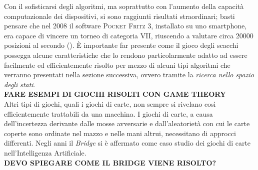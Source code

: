 Con il sofisticarsi degli algoritmi, ma soprattutto con l'aumento della capacità computazionale dei dispositivi, si sono raggiunti risultati straordinari; basti pensare che nel 2008 il software \textsc{Pocket Fritz 3}, installato su uno smartphone, era capace di vincere un torneo di categoria VII, riuscendo a valutare circa 20000 posizioni al secondo (\cite{pocketfritz}).
È importante far presente come il gioco degli scacchi possegga alcune caratteristiche che lo rendono particolarmente adatto ad essere facilmente ed efficientemente risolto per mezzo di alcuni tipi algoritmi che verranno presentati nella sezione successiva, ovvero tramite la \emph{ricerca nello spazio degli stati}.\\




\textbf{FARE ESEMPI DI GIOCHI RISOLTI CON GAME THEORY}\\



Altri tipi di giochi, quali i giochi di carte, non sempre si rivelano così efficientemente trattabili da una macchina.
I giochi di carte, a causa dell'incertezza derivante dalle mosse avversarie e dall'aleatorietà con cui le carte coperte sono ordinate nel mazzo e nelle mani altrui, necessitano di approcci differenti.
Negli anni il \emph{Bridge} si è affermato come caso studio dei giochi di carte nell'Intelligenza Artificiale.\\




\textbf{DEVO SPIEGARE COME IL BRIDGE VIENE RISOLTO?}\\




